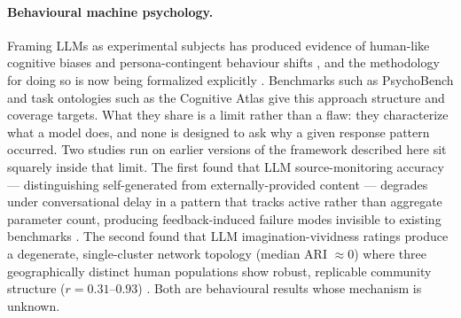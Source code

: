\documentclass[11pt]{article}
\begin{document}
\paragraph{Behavioural machine psychology.} Framing LLMs as experimental
subjects has produced evidence of human-like cognitive biases and
persona-contingent behaviour shifts
\citep{hagendorff2023machinepsych,binz2023gpt3cogpsy}, and the methodology
for doing so is now being formalized explicitly \citep{lin2025simulators}.
Benchmarks such as PsychoBench \citep{huang2024psychobench} and task
ontologies such as the Cognitive Atlas \citep{poldrack2011cogatlas} give
this approach structure and coverage targets. What they share is a limit
rather than a flaw: they characterize what a model does, and none is
designed to ask why a given response pattern occurred. Two studies run on
earlier versions of the framework described here sit squarely inside that
limit. The first found that LLM source-monitoring accuracy --- distinguishing
self-generated from externally-provided content --- degrades under
conversational delay in a pattern that tracks active rather than aggregate
parameter count, producing feedback-induced failure modes invisible to
existing benchmarks \citep{ranjan2026reality}. The second found that LLM
imagination-vividness ratings produce a degenerate, single-cluster network
topology (median ARI $\approx 0$) where three geographically distinct human
populations show robust, replicable community structure
($r = 0.31$--$0.93$) \citep{ranjan2025psychological}. Both are behavioural
results whose mechanism is unknown.
\end{document}
